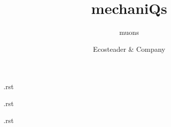 \documentclass[11pt]{extbook} %
\title{mechaniQs}
\subtitle{muons}
\author{Ecosteader & Company}
\date{}
\begin{document}

\frontmatter
\maketitle
\tableofcontents
\mainmatter
\preface.rst

\two.rst

\charm.rst
\end{document}
